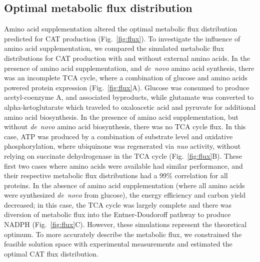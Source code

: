 \documentclass[journal=asbcd6,manuscript=article]{achemso}
\begin{document}

\subsection{Optimal metabolic flux distribution}
Amino acid supplementation altered the optimal metabolic flux distribution predicted for CAT production (Fig.~\ref{fig:flux}).
To investigate the influence of amino acid supplementation, we compared the simulated metabolic flux distributions for CAT production with and without external amino acids.
In the presence of amino acid supplementation, and \textit{de~novo} amino acid synthesis, there was an incomplete TCA cycle, where a combination of glucose and amino acids powered protein expression (Fig.~\ref{fig:flux}A).
Glucose was consumed to produce acetyl-coenzyme A, and associated byproducts, while glutamate was converted to alpha-ketoglutarate which traveled to oxaloacetic acid and pyruvate for additional amino acid biosynthesis.
In the presence of amino acid supplementation, but without \textit{de~novo} amino acid biosynthesis, there was no TCA cycle flux.
In this case, ATP was produced by a combination of substrate level and oxidative phosphorylation, where ubiquinone was regenerated via \textit{nuo} activity, without relying on succinate dehydrogenase in the TCA cycle (Fig.~\ref{fig:flux}B).
These first two cases where amino acids were available had similar performance, and their respective metabolic flux distributions had a 99\% correlation for all proteins.
In the absence of amino acid supplementation (where all amino acids were synthesized \textit{de~novo} from glucose), the energy efficiency and carbon yield decreased; in this case, the TCA cycle was largely complete and there was diversion of metabolic flux into the Entner-Doudoroff pathway to produce NADPH (Fig.~\ref{fig:flux}C).
However, these simulations represent the theoretical optimum.
To more accurately describe the metabolic flux, we constrained the feasible solution space with experimental measurements and estimated the optimal CAT flux distribution.
\end{document}

